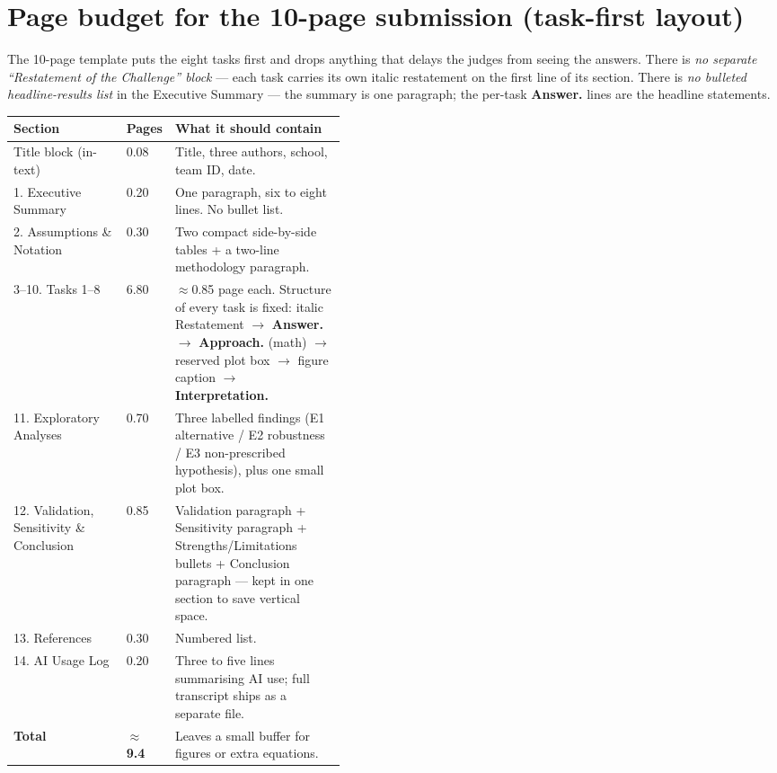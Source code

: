 \documentclass[11pt,a4paper]{article}
\begin{document}
\section{Page budget for the 10-page submission (task-first layout)}

The 10-page template puts the eight tasks first and drops anything that delays the judges from seeing the answers. There is \emph{no separate ``Restatement of the Challenge'' block} — each task carries its own italic restatement on the first line of its section. There is \emph{no bulleted headline-results list} in the Executive Summary — the summary is one paragraph; the per-task \textbf{Answer.} lines are the headline statements.

\begin{tabularx}{\linewidth}{@{}p{0.34\linewidth}p{0.09\linewidth}X@{}}
\toprule
\textbf{Section} & \textbf{Pages} & \textbf{What it should contain} \\
\midrule
Title block (in-text)             & 0.08 & Title, three authors, school, team ID, date. \\
1. Executive Summary              & 0.20 & One paragraph, six to eight lines. No bullet list. \\
2. Assumptions \& Notation        & 0.30 & Two compact side-by-side tables + a two-line methodology paragraph. \\
3–10. Tasks 1–8                   & 6.80 & $\approx$0.85 page each. Structure of every task is fixed: italic Restatement $\to$ \textbf{Answer.} $\to$ \textbf{Approach.} (math) $\to$ reserved plot box $\to$ figure caption $\to$ \textbf{Interpretation.} \\
11. Exploratory Analyses          & 0.70 & Three labelled findings (E1 alternative / E2 robustness / E3 non-prescribed hypothesis), plus one small plot box. \\
12. Validation, Sensitivity \& Conclusion & 0.85 & Validation paragraph + Sensitivity paragraph + Strengths/Limitations bullets + Conclusion paragraph — kept in one section to save vertical space. \\
13. References                    & 0.30 & Numbered list. \\
14. AI Usage Log                  & 0.20 & Three to five lines summarising AI use; full transcript ships as a separate file. \\
\midrule
\textbf{Total}                    & \textbf{$\approx$\,9.4} & Leaves a small buffer for figures or extra equations. \\
\bottomrule
\end{tabularx}
\end{document}

